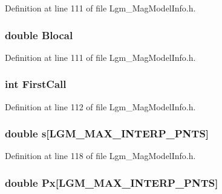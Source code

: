 Definition at line 111 of file Lgm\_\-MagModelInfo.h.\hypertarget{struct_lgm___mag_model_info_3c9886361e1ccd93a330528121ebe6d3}{
\subsubsection[{Blocal}]{\setlength{\rightskip}{0pt plus 5cm}double {\bf Blocal}}}
\label{struct_lgm___mag_model_info_3c9886361e1ccd93a330528121ebe6d3}




Definition at line 111 of file Lgm\_\-MagModelInfo.h.\hypertarget{struct_lgm___mag_model_info_52587930b11ea1eb053f0306dbc7973e}{
\subsubsection[{FirstCall}]{\setlength{\rightskip}{0pt plus 5cm}int {\bf FirstCall}}}
\label{struct_lgm___mag_model_info_52587930b11ea1eb053f0306dbc7973e}




Definition at line 112 of file Lgm\_\-MagModelInfo.h.\hypertarget{struct_lgm___mag_model_info_cf41bfa63c25a6466792c68b7b483bed}{
\subsubsection[{s}]{\setlength{\rightskip}{0pt plus 5cm}double {\bf s}\mbox{[}LGM\_\-MAX\_\-INTERP\_\-PNTS\mbox{]}}}
\label{struct_lgm___mag_model_info_cf41bfa63c25a6466792c68b7b483bed}




Definition at line 118 of file Lgm\_\-MagModelInfo.h.\hypertarget{struct_lgm___mag_model_info_dd03b0d5df37a9e1074dec8d2b370a2d}{
\subsubsection[{Px}]{\setlength{\rightskip}{0pt plus 5cm}double {\bf Px}\mbox{[}LGM\_\-MAX\_\-INTERP\_\-PNTS\mbox{]}}}
\label{struct_lgm___mag_model_info_dd03b0d5df37a9e1074dec8d2b370a2d}




